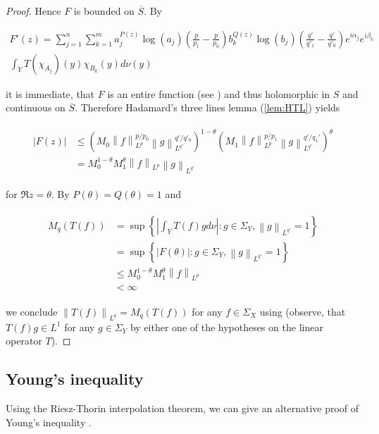 \begin{proof}
	Hence $F$ is bounded on $\overline{S}$. By 

\begin{multline*}
	F'(z) = \sum_{j = 1}^n\sum_{k = 1}^m a^{P(z)}_j\log \left( a_j \right) \left( \frac{p}{p_1} - \frac{p}{p_0} \right) b_k^{Q(z)}\log\left( b_j \right)\left( \frac{q'}{q'_1} - \frac{q'}{q'_0} \right) e^{i\alpha_j} e^{i\beta_k} \\\int_YT(\chi_{A_j})(y)\chi_{B_k}(y)d\nu(y) 	
\end{multline*}

	it is immediate, that $F$ is an entire function (see \cite[198]{rudin:rc_analysis:1987}) and thus holomorphic in $S$ and continuous on $\overline{S}$. Therefore Hadamard's three lines lemma (\ref{lem:HTL}) yields

\begin{gather*}
	\begin{aligned}
		\left| F(z) \right| &\leqslant \left( M_0  \left\|f\right\|_{L^p}^{p/p_0} \left\|g\right\|_{L^{q'}}^{q'/q'_0} \right)^{1 - \theta}\left(  M_1 \left\|f\right\|_{L^p}^{p/p_1}\left\|g\right\|_{L^{q'}}^{q'/q_1'} \right)^\theta\\
			&= M_0^{1 - \theta}M_1^\theta \left\|f\right\|_{L^p}\left\|g\right\|_{L^{q'}}
	\end{aligned}
\end{gather*}

	for $\Re z = \theta$. By $P(\theta) = Q(\theta) = 1$ and

\begin{gather*}
	\begin{aligned}
		M_q\left( T(f) \right) &= \sup\left\{\left| \int_Y T(f)gd\nu\right| : g \in \Sigma_Y, \left\|g\right\|_{L^{q'}} = 1\right\}\\
		&=  \sup\left\{\left| F(\theta)\right| : g \in \Sigma_Y, \left\|g\right\|_{L^{q'}} = 1\right\}\\
		&\leqslant M_0^{1 - \theta}M_1^\theta \left\|f\right\|_{L^p}\\
		&< \infty
	\end{aligned}
\end{gather*}

	we conclude $\left\| T(f)\right\|_{L^q} = M_q\left( T(f) \right)$ for any $f \in \Sigma_X$ using \cite[189]{folland:real_analysis:1999} (observe, that $T(f)g \in L^1$ for any $g \in \Sigma_Y$ by either one of the hypotheses on the linear operator $T$).
\end{proof}

\subsection{Young's inequality}
Using the Riesz-Thorin interpolation theorem, we can give an alternative proof of Young's inequality \cite[22--23]{grafakos:fourier:2014}.

